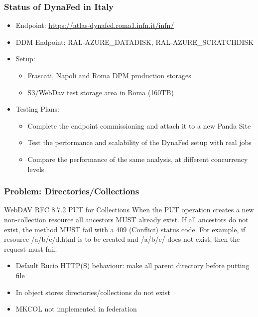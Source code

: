 \documentclass{beamer}
\begin{document}
\begin{frame}
  \frametitle{Status of DynaFed in Italy}
  \begin{itemize}
    \item Endpoint: \url{https://atlas-dynafed.roma1.infn.it/infn/}
		\item DDM Endpoint: RAL-AZURE\_DATADISK, RAL-AZURE\_SCRATCHDISK
    \item Setup:
    \begin{itemize}
      \item Frascati, Napoli and Roma DPM  production storages
      \item S3/WebDav test storage area in Roma (160TB)
    \end{itemize}
		\item Testing Plans:
    \begin{itemize}
      \item Complete the endpoint commissioning and attach it to a new Panda Site
      \item Test the performance and scalability of the DynaFed setup with real jobs
      \item Compare the performance of the same analysis, at different concurrency levels
    \end{itemize}
  \end{itemize}
\end{frame}

\begin{frame}
  \frametitle{Problem: Directories/Collections}
  \begin{block}{WebDAV RFC 8.7.2 PUT for Collections}
    When the PUT operation creates a new non-collection resource all ancestors MUST already exist. If all ancestors do not exist, the method MUST fail with a 409 (Conflict) status code. For example, if resource /a/b/c/d.html is to be created and /a/b/c/ does not exist, then the request must fail.
  \end{block}
  \begin{itemize}
    \item<1- > Default Rucio HTTP(S) behaviour: make all parent directory before putting file
    \item<2- > In object stores directories/collections do not exist
    \item<2- > MKCOL not implemented in federation
  \end{itemize}
\end{frame}
\end{document}
